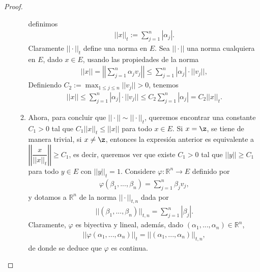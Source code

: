 \begin{proof}
\begin{enumerate}
\begin{enumerate}
                definimos
                \begin{align*}
                    ||x||_t:=\sum_{j=1}^n|\alpha_j|.
                \end{align*}
                Claramente $||\cdot||_t$ define una norma en $E$. Sea $||\cdot||$ una norma cualquiera en $E$, dado $x \in E$, usando las propiedades de la norma 
                \begin{align*}
                    ||x||=\left|\left|\sum_{j=1}^n \alpha_jv_j\right|\right|\leq \sum_{j=1}^n|\alpha_j|\cdot ||v_j||,
                \end{align*}
                Definiendo $\displaystyle C_2:=\max_{1\leq j\leq n} ||v_j||>0$, tenemos
                \begin{align*}
                    ||x|| \leq \sum_{j=1}^n|\alpha_j|\cdot||v_j||\leq C_2\sum_{j=1}^n|\alpha_j|=C_2||x||_t.
                \end{align*}
                \item Ahora, para concluir que $||\cdot||\sim ||\cdot||_t$, queremos encontrar una constante $C_1>0$ tal que $C_1||x||_t\leq ||x||$ para todo $x \in E$. Si $x=\z$, se tiene de manera trivial, si $x\neq \z$, entonces la expresión anterior es equivalente a\\
                $\left|\left|\dfrac{x}{||x||_t}\right|\right|\geq C_1$, es decir, queremos ver que existe $C_1>0$ tal que $||y||\geq C_1$ para todo $y\in E$ con $||y||_t=1$. Considere $\varphi:\mathbb{R}^n\to E$ definido por
                \begin{align*}
                    \varphi(\beta_1,...,\beta_n)=\sum_{j=1}^n\beta_jv_j,
                \end{align*}
                y dotamos a $\mathbb{R}^n$ de la norma $||\cdot||_{t,n}$ dada por
                \begin{align*}
                    ||(\beta_1,...,\beta_n)||_{t,n}=\sum_{j=1}^n|\beta_j|.
                \end{align*}
                Claramente, $\varphi$ es biyectiva y lineal, además, dado $(\alpha_1,...,\alpha_n)\in \mathbb{R}^n$, 
                \begin{align*}
                    ||\varphi(\alpha_1,...,\alpha_n)||_t=||(\alpha_1,...,\alpha_n)||_{t,n},
                \end{align*}
                de donde se deduce que $\varphi$ es continua.
                

\end{enumerate}
\end{enumerate}
\end{proof}
